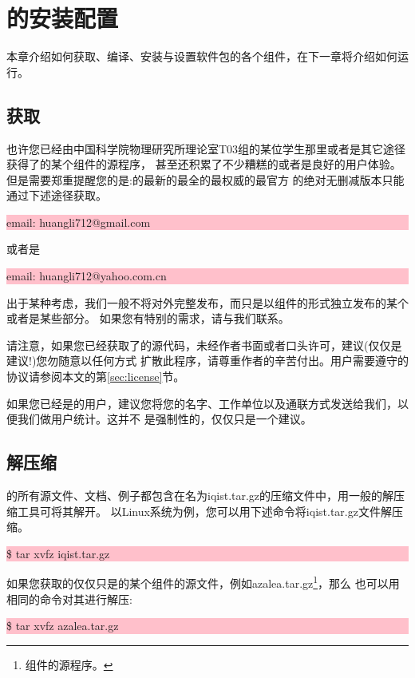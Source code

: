 \chapter{{\iqist}的安装配置}
\label{chap:install}

本章介绍如何获取、编译、安装与设置{\iqist}软件包的各个组件，在下一章将介绍如何运行{\iqist}。

\section{获取{\iqist}}
\label{sec:get}

也许您已经由中国科学院物理研究所理论室T03组的某位学生那里或者是其它途径获得了\iqist 的某个组件的源程序，
甚至还积累了不少糟糕的或者是良好的用户体验。但是需要郑重提醒您的是:{\iqist}的最新的最全的最权威的最官方
的绝对无删减版本只能通过下述途径获取。

\noindent\colorbox{pink}{\parbox[r]{\linewidth}{\quad email: huangli712@gmail.com}}

或者是

\noindent\colorbox{pink}{\parbox[r]{\linewidth}{\quad email: huangli712@yahoo.com.cn}}

出于某种考虑，我们一般不将{\iqist}对外完整发布，而只是以组件的形式独立发布{\iqist}的某个或者是某些部分。
如果您有特别的需求，请与我们联系。

请注意，如果您已经获取了{\iqist}的源代码，未经作者书面或者口头许可，建议(仅仅是建议!)您勿随意以任何方式
扩散此程序，请尊重作者的辛苦付出。用户需要遵守的协议请参阅本文的第\ref{sec:license}节。

如果您已经是{\iqist}的用户，建议您将您的名字、工作单位以及通联方式发送给我们，以便我们做用户统计。这并不
是强制性的，仅仅只是一个建议。 

\section{解压缩{\iqist}}
\label{sec:unzip}

{\iqist}的所有源文件、文档、例子都包含在名为iqist.tar.gz的压缩文件中，用一般的解压缩工具可将其解开。
以Linux系统为例，您可以用下述命令将iqist.tar.gz文件解压缩。

\noindent\colorbox{pink}{\parbox[r]{\linewidth}{\quad \$ tar xvfz iqist.tar.gz}}

如果您获取的仅仅只是{\iqist}的某个组件的源文件，例如azalea.tar.gz\footnote{{\azalea}组件的源程序。}，那么
也可以用相同的命令对其进行解压:

\noindent\colorbox{pink}{\parbox[r]{\linewidth}{\quad \$ tar xvfz azalea.tar.gz}}

